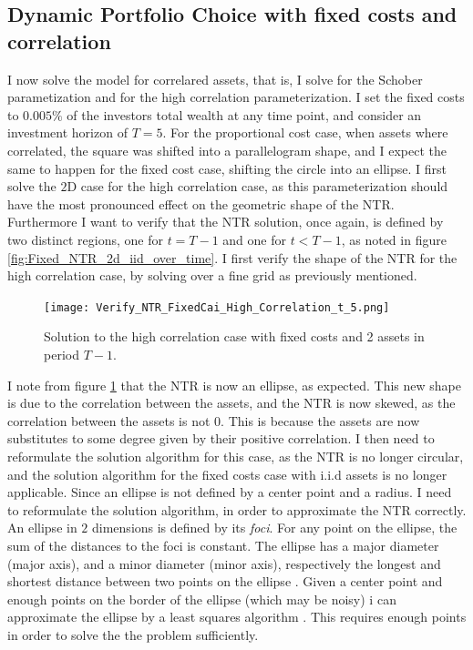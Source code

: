 \documentclass[11pt]{article}
\begin{document}
\subsection{Dynamic Portfolio Choice with fixed costs and correlation}
I now solve the model for correlared assets, that is, I solve for the Schober parametization and for the high correlation parameterization.
I set the fixed costs to $0.005\%$ of the investors total wealth at any time point, and consider an investment horizon of $T = 5$.
For the proportional cost case, when assets where correlated, the square was shifted into a parallelogram shape, and I expect the same to happen for the fixed cost case,
shifting the circle into an ellipse. I first solve the $2$D case for the high correlation case, as this parameterization 
should have the most pronounced effect on the geometric shape of the \ac{NTR}. Furthermore I want to verify that the \ac{NTR} solution,
once again, is defined by two distinct regions, one for $t = T-1$ and one for $t < T-1$, as noted in figure \ref{fig:Fixed_NTR_2d_iid_over_time}.
I first verify the shape of the NTR for the high correlation case, by solving over a fine grid as previously mentioned.

\begin{figure}[!ht]
    \centering
    \texttt{[image: Verify\_NTR\_FixedCai\_High\_Correlation\_t\_5.png]}
    \caption{Solution to the high correlation case with fixed costs and 2 assets in period $T-1$.}
    \label{fig:NTR_Verify_High_Correlation}
\end{figure}

I note from figure \ref{fig:NTR_Verify_High_Correlation} that the NTR is now an ellipse, as expected.
This new shape is due to the correlation between the assets, and the NTR is now skewed, as the correlation between the assets is not $0$.
This is because the assets are now substitutes to some degree given by their positive correlation.
I then need to reformulate the solution algorithm for this case, as the NTR is no longer circular, and the solution algorithm for the fixed costs case with i.i.d assets is no longer applicable.
Since an ellipse is not defined by a center point and a radius. I need to reformulate the solution algorithm, in order to approximate the NTR correctly.\\

An ellipse in $2$ dimensions is defined by its \textit{foci}. For any point on the ellipse, the sum of the distances to the foci is constant.
The ellipse has a major diameter (major axis), and a minor diameter (minor axis), respectively the longest and shortest distance between two points on the ellipse
\autocite{Ivanov2020Ellipse}. Given a center point and enough points on the border of the ellipse (which may be noisy)
i can approximate the ellipse by a least squares algorithm \autocite{gander1994least}. This requires enough points in order to solve the the problem sufficiently.
\end{document}
